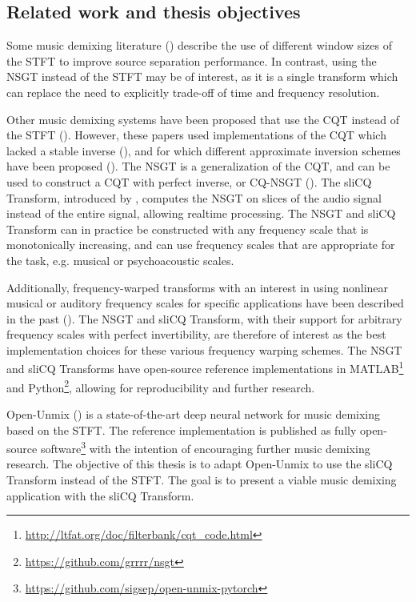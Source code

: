 \documentclass[report.tex]{subfiles}
\begin{document}
\subsection{Related work and thesis objectives}

Some music demixing literature (\cite{fitzgerald1, driedger, tftradeoff1, tftradeoff2}) describe the use of different window sizes of the STFT to improve source separation performance. In contrast, using the NSGT instead of the STFT may be of interest, as it is a single transform which can replace the need to explicitly trade-off of time and frequency resolution.

Other music demixing systems have been proposed that use the CQT instead of the STFT (\cite{fitzgerald2, cqtseparation, bettermusicsep}). However, these papers used implementations of the CQT which lacked a stable inverse (\cite{lackinverse}), and for which different approximate inversion schemes have been proposed (\cite{klapuricqt, fitzgeraldcqt}). The NSGT is a generalization of the CQT, and can be used to construct a CQT with perfect inverse, or CQ-NSGT (\cite{invertiblecqt, variableq1}). The sliCQ Transform, introduced by \textcite{slicq}, computes the NSGT on slices of the audio signal instead of the entire signal, allowing realtime processing. The NSGT and sliCQ Transform can in practice be constructed with any frequency scale that is monotonically increasing, and can use frequency scales that are appropriate for the task, e.g. musical or psychoacoustic scales.

Additionally, frequency-warped transforms with an interest in using nonlinear musical or auditory frequency scales for specific applications have been described in the past (\cite{warped1, warped2, earlywarped1, earlywarped2, warpedcomparison, warpedpsycho}). The NSGT and sliCQ Transform, with their support for arbitrary frequency scales with perfect invertibility, are therefore of interest as the best implementation choices for these various frequency warping schemes. The NSGT and sliCQ Transforms have open-source reference implementations in MATLAB\footnote{\url{http://ltfat.org/doc/filterbank/cqt_code.html}} and Python\footnote{\url{https://github.com/grrrr/nsgt}}, allowing for reproducibility and further research.

Open-Unmix (\cite{umx}) is a state-of-the-art deep neural network for music demixing based on the STFT. The reference implementation is published as fully open-source software\footnote{\url{https://github.com/sigsep/open-unmix-pytorch}} with the intention of encouraging further music demixing research. The objective of this thesis is to adapt Open-Unmix to use the sliCQ Transform instead of the STFT. The goal is to present a viable music demixing application with the sliCQ Transform.
\end{document}
